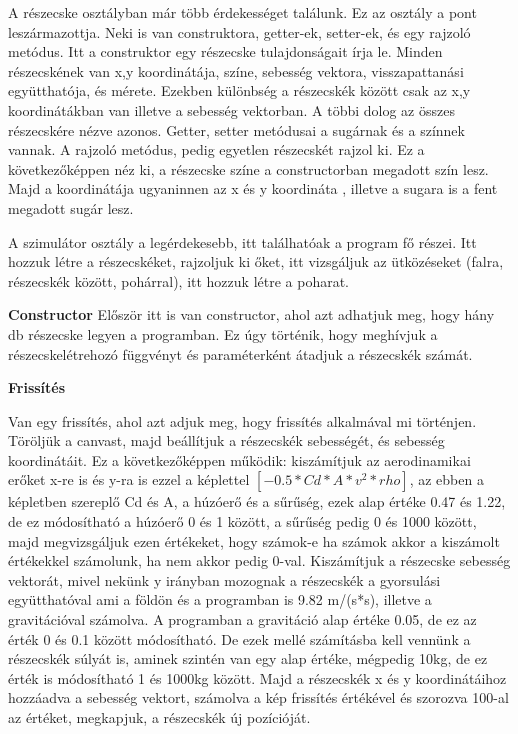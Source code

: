 
A részecske osztályban már több érdekességet találunk. Ez az osztály a pont leszármazottja. Neki is van construktora, getter-ek, setter-ek, és egy rajzoló metódus. Itt a construktor egy részecske tulajdonságait írja le. Minden részecskének van x,y koordinátája, színe, sebesség vektora, visszapattanási együtthatója, és mérete. Ezekben különbség a részecskék között csak az x,y koordinátákban van illetve a sebesség vektorban. A többi dolog az összes részecskére nézve azonos. Getter, setter metódusai a sugárnak és a színnek vannak. A rajzoló metódus, pedig egyetlen részecskét rajzol ki. Ez a következőképpen néz ki, a részecske színe a constructorban megadott szín lesz. Majd a koordinátája ugyaninnen az x és y koordináta , illetve a sugara is a fent megadott sugár lesz. 


A szimulátor osztály a legérdekesebb, itt találhatóak a program fő részei. Itt hozzuk létre a részecskéket, rajzoljuk ki őket, itt vizsgáljuk az ütközéseket (falra, részecskék között, pohárral), itt hozzuk létre a poharat. 

\textbf{Constructor}
Először itt is van constructor, ahol azt adhatjuk meg, hogy hány db részecske legyen a programban. Ez úgy történik, hogy meghívjuk a részecskelétrehozó függvényt és paraméterként átadjuk a részecskék számát.

\textbf{Frissítés}

Van egy frissítés, ahol azt adjuk meg, hogy frissítés alkalmával mi történjen. Töröljük a canvast, majd beállítjuk a részecskék sebességét, és sebesség koordinátáit. Ez a következőképpen működik: kiszámítjuk az aerodinamikai erőket x-re is és y-ra is ezzel a képlettel $[-0.5 * Cd * A * v^2 * rho]$, az ebben a képletben szereplő Cd és A, a húzóerő és a sűrűség, ezek alap értéke 0.47 és 1.22, de ez módosítható a húzóerő 0 és 1 között, a sűrűség pedig 0 és 1000 között, majd megvizsgáljuk ezen értékeket, hogy számok-e ha számok akkor a kiszámolt értékekkel számolunk, ha nem akkor pedig 0-val. Kiszámítjuk a részecske sebesség vektorát, mivel nekünk y irányban mozognak a részecskék a gyorsulási együtthatóval ami a földön és a programban is 9.82 m/(s*s), illetve a gravitációval számolva. A programban a gravitáció alap értéke 0.05, de ez az érték 0 és 0.1 között módosítható. De ezek mellé számításba kell vennünk a részecskék súlyát is, aminek szintén van egy alap értéke, mégpedig 10kg, de ez érték is módosítható 1 és 1000kg között. Majd a részecskék x és y koordinátáihoz hozzáadva a sebesség vektort, számolva a kép frissítés értékével és szorozva 100-al az értéket, megkapjuk, a részecskék új pozícióját.


